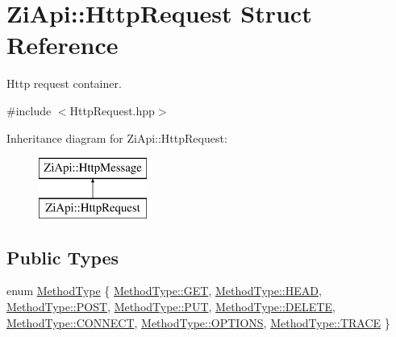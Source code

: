 \hypertarget{structZiApi_1_1HttpRequest}{}\section{Zi\+Api\+::Http\+Request Struct Reference}
\label{structZiApi_1_1HttpRequest}


Http request container.  




{\ttfamily \#include $<$Http\+Request.\+hpp$>$}

Inheritance diagram for Zi\+Api\+::Http\+Request\+:\begin{figure}[H]
\begin{center}
\leavevmode
\includegraphics[height=2.000000cm]{structZiApi_1_1HttpRequest}
\end{center}
\end{figure}
\subsection*{Public Types}
\begin{DoxyCompactItemize}
\item 
enum \mbox{\hyperlink{structZiApi_1_1HttpRequest_a8592cff867cbbc5cc43bd3a4d6053a1b}{Method\+Type}} \{ \newline
\mbox{\hyperlink{structZiApi_1_1HttpRequest_a8592cff867cbbc5cc43bd3a4d6053a1ba7528035a93ee69cedb1dbddb2f0bfcc8}{Method\+Type\+::\+G\+ET}}, 
\mbox{\hyperlink{structZiApi_1_1HttpRequest_a8592cff867cbbc5cc43bd3a4d6053a1bae15e216fc1c639f787b1231ecdfa1bf8}{Method\+Type\+::\+H\+E\+AD}}, 
\mbox{\hyperlink{structZiApi_1_1HttpRequest_a8592cff867cbbc5cc43bd3a4d6053a1baa02439ec229d8be0e74b0c1602392310}{Method\+Type\+::\+P\+O\+ST}}, 
\mbox{\hyperlink{structZiApi_1_1HttpRequest_a8592cff867cbbc5cc43bd3a4d6053a1ba3e75383a5992a6d15fb81e872e46e256}{Method\+Type\+::\+P\+UT}}, 
\newline
\mbox{\hyperlink{structZiApi_1_1HttpRequest_a8592cff867cbbc5cc43bd3a4d6053a1ba32f68a60cef40faedbc6af20298c1a1e}{Method\+Type\+::\+D\+E\+L\+E\+TE}}, 
\mbox{\hyperlink{structZiApi_1_1HttpRequest_a8592cff867cbbc5cc43bd3a4d6053a1bab57e2519e26151feacdbe52076bc39ec}{Method\+Type\+::\+C\+O\+N\+N\+E\+CT}}, 
\mbox{\hyperlink{structZiApi_1_1HttpRequest_a8592cff867cbbc5cc43bd3a4d6053a1ba164dd62adb30ca051b5289672a572f9b}{Method\+Type\+::\+O\+P\+T\+I\+O\+NS}}, 
\mbox{\hyperlink{structZiApi_1_1HttpRequest_a8592cff867cbbc5cc43bd3a4d6053a1ba2d3e4144aa384b18849ab9a8abad74d6}{Method\+Type\+::\+T\+R\+A\+CE}}
 \}
\end{DoxyCompactItemize}
